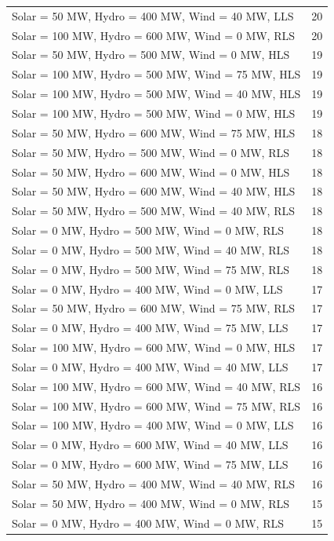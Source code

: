\documentclass[10pt]{report}
\begin{document}
\begin{table}[H]
{\begin{tabular}{lr}
Solar = 50 MW, Hydro = 400 MW, Wind = 40 MW, LLS & 20 \\
Solar = 100 MW, Hydro = 600 MW, Wind = 0 MW, RLS & 20 \\
Solar = 50 MW, Hydro = 500 MW, Wind = 0 MW, HLS & 19 \\
Solar = 100 MW, Hydro = 500 MW, Wind = 75 MW, HLS & 19 \\
Solar = 100 MW, Hydro = 500 MW, Wind = 40 MW, HLS & 19 \\
Solar = 100 MW, Hydro = 500 MW, Wind = 0 MW, HLS & 19 \\
Solar = 50 MW, Hydro = 600 MW, Wind = 75 MW, HLS & 18 \\
Solar = 50 MW, Hydro = 500 MW, Wind = 0 MW, RLS & 18 \\
Solar = 50 MW, Hydro = 600 MW, Wind = 0 MW, HLS & 18 \\
Solar = 50 MW, Hydro = 600 MW, Wind = 40 MW, HLS & 18 \\
Solar = 50 MW, Hydro = 500 MW, Wind = 40 MW, RLS & 18 \\
Solar = 0 MW, Hydro = 500 MW, Wind = 0 MW, RLS & 18 \\
Solar = 0 MW, Hydro = 500 MW, Wind = 40 MW, RLS & 18 \\
Solar = 0 MW, Hydro = 500 MW, Wind = 75 MW, RLS & 18 \\
Solar = 0 MW, Hydro = 400 MW, Wind = 0 MW, LLS & 17 \\
Solar = 50 MW, Hydro = 600 MW, Wind = 75 MW, RLS & 17 \\
Solar = 0 MW, Hydro = 400 MW, Wind = 75 MW, LLS & 17 \\
Solar = 100 MW, Hydro = 600 MW, Wind = 0 MW, HLS & 17 \\
Solar = 0 MW, Hydro = 400 MW, Wind = 40 MW, LLS & 17 \\
Solar = 100 MW, Hydro = 600 MW, Wind = 40 MW, RLS & 16 \\
Solar = 100 MW, Hydro = 600 MW, Wind = 75 MW, RLS & 16 \\
Solar = 100 MW, Hydro = 400 MW, Wind = 0 MW, LLS & 16 \\
Solar = 0 MW, Hydro = 600 MW, Wind = 40 MW, LLS & 16 \\
Solar = 0 MW, Hydro = 600 MW, Wind = 75 MW, LLS & 16 \\
Solar = 50 MW, Hydro = 400 MW, Wind = 40 MW, RLS & 16 \\
Solar = 50 MW, Hydro = 400 MW, Wind = 0 MW, RLS & 15 \\
Solar = 0 MW, Hydro = 400 MW, Wind = 0 MW, RLS & 15 \\

\end{tabular}}
\end{table}
\end{document}
